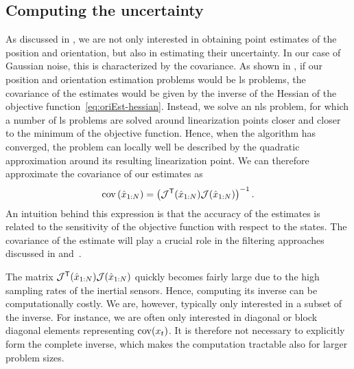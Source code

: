 \subsection{Computing the uncertainty}
\label{sec:oriEst-smoothingUncertainty}
As discussed in , we are not only interested in obtaining point estimates of the position and orientation, but also in estimating their uncertainty. In our case of Gaussian noise, this is characterized by the covariance. As shown in \eg \cite{ljung:1999,verhaegenV:2007}, if our position and orientation estimation problems would be \gls{ls} problems, the covariance of the estimates would be given by the inverse of the Hessian of the objective function~\eqref{eq:oriEst-hessian}. Instead, we solve an \gls{nls} problem, for which a number of \gls{ls} problems are solved around linearization points closer and closer to the minimum of the objective function. Hence, when the algorithm has converged, the problem can locally well be described by the quadratic approximation around its resulting linearization point. We can therefore approximate the covariance of our estimates as
\begin{align}
\operatorname{cov}{ (\hat{x}_{1:N}) } = \left( \mathcal{J}^{\mathsf{T}}(\hat{x}_{1:N}) \mathcal{J}(\hat{x}_{1:N}) \right)^{-1}.
\end{align}
An intuition behind this expression is that the accuracy of the estimates is related to the sensitivity of the objective function with respect to the states. The covariance of the estimate will play a crucial role in the filtering approaches discussed in  and~.

The matrix $\mathcal{J}^{\mathsf{T}}(\hat{x}_{1:N}) \mathcal{J}(\hat{x}_{1:N})$ quickly becomes fairly large due to the high sampling rates of the inertial sensors. Hence, computing its inverse can be computationally costly. We are, however, typically only interested in a subset of the inverse. For instance, we are often only interested in diagonal or block diagonal elements representing $\operatorname{cov} (x_t)$. It is therefore not necessary to explicitly form the complete inverse, which makes the computation tractable also for larger problem sizes.


